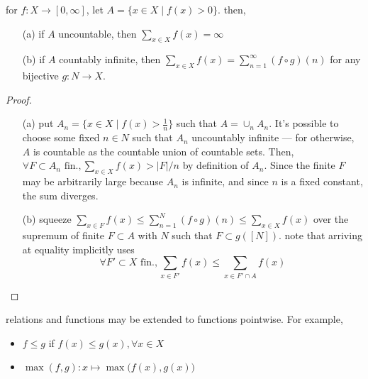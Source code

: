 \begin{prop}\label{prop:0.20}\label{prop:00:fn-sums}
  for ${f:X\rightarrow [0,\infty]}$, let ${A=\{x\in X\mid f(x)>0\}}$.
  then,
  \begin{itemize}
  \item[(a)] if $A$ uncountable, then ${\sum_{x\in X} f(x) = \infty}$
  \item[(b)] if $A$ countably infinite, then
    ${\sum_{x\in X} f(x) = \sum_{n=1}^\infty (f\circ g)(n)}$
    for any bijective ${g: N\rightarrow X}$.
  \end{itemize}
\end{prop}
\begin{proof}
  \begin{itemize}
  \item[(a)] put ${A_n=\{x\in X\mid f(x) > \frac{1}{n}\}}$
    such that ${A=\cup_n A_n}$.
    It's possible to choose some fixed ${n\in N}$ such that
    $A_n$ uncountably infinite --- for otherwise, $A$ is
    countable as the countable union of countable sets.
    Then,
    ${\forall F\subset A_n \text{ fin.}, \sum_{x\in X} f(x) > |F|/n}$
    by definition of $A_n$.
    Since the finite $F$ may be arbitrarily large because $A_n$
    is infinite, and since $n$ is a fixed constant,
    the sum diverges.
  \item[(b)] squeeze
    ${\sum_{x\in F} f(x)\leq \sum_{n=1}^N(f\circ g)(n)\leq \sum_{x\in X} f(x)}$
    over the supremum of finite ${F\subset A}$
    with $N$ such that $F\subset g([N])$.
    note that arriving at equality implicitly uses
    \[
    \forall F'\subset X \text{ fin.},
    \sum_{x\in F'} f(x) \leq \sum_{x\in F'\cap A} f(x)
    \]
  \end{itemize}
\end{proof}

\begin{rem}{}
  relations and functions may be extended to functions pointwise.
  For example,
  \begin{itemize}
  \item ${f\leq g}$ if ${f(x)\leq g(x),\forall x\in X}$
  \item ${\max(f, g): x\mapsto \max\big(f(x), g(x)\big)}$
  \end{itemize}
\end{rem}

